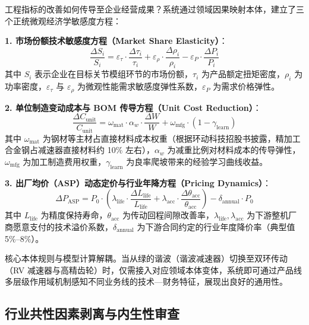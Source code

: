 \documentclass[11pt,a4paper]{ctexart}
\begin{document}
工程指标的改善如何传导至企业经营成果？系统通过领域因果映射本体，建立了三个正统微观经济学敏感度方程：

\textbf{1. 市场份额技术敏感度方程（Market Share Elasticity）}：
\begin{equation}
  \frac{\Delta S_i}{S_i} = \varepsilon_{\tau} \cdot \frac{\Delta \tau_i}{\tau_i} + \varepsilon_{\rho} \cdot \frac{\Delta \rho_i}{\rho_i} - \varepsilon_{P} \cdot \frac{\Delta P_i}{P_i}
\end{equation}
其中 $S_i$ 表示企业在目标关节模组环节的市场份额，$\tau_i$ 为产品额定扭矩密度，$\rho_i$ 为功率密度，$\varepsilon_{\tau}$ 与 $\varepsilon_{\rho}$ 为微观性能需求敏感度弹性系数，$\varepsilon_{P}$ 为需求价格弹性。

\textbf{2. 单位制造变动成本与 BOM 传导方程（Unit Cost Reduction）}：
\begin{equation}
  \frac{\Delta C_{\text{unit}}}{C_{\text{unit}}} = \omega_{\text{mat}} \cdot \alpha_w \cdot \frac{\Delta W}{W} + \omega_{\text{mfg}} \cdot (1 - \gamma_{\text{learn}})
\end{equation}
其中 $\omega_{\text{mat}}$ 为钢材等主材占直接材料成本权重（根据环动科技招股书披露，精加工合金钢占减速器直接材料约 10\% 左右），$\alpha_w$ 为减重比例对材料成本的传导弹性，$\omega_{\text{mfg}}$ 为加工制造费用权重，$\gamma_{\text{learn}}$ 为良率爬坡带来的经验学习曲线收益。

\textbf{3. 出厂均价（ASP）动态定价与行业年降方程（Pricing Dynamics）}：
\begin{equation}
  \Delta P_{\text{ASP}} = P_0 \cdot \left( \lambda_{\text{life}} \cdot \frac{\Delta L_{\text{life}}}{L_{\text{life}}} + \lambda_{\text{acc}} \cdot \frac{\Delta \theta_{\text{acc}}}{\theta_{\text{acc}}} \right) - \delta_{\text{annual}} \cdot P_0
\end{equation}
其中 $L_{\text{life}}$ 为精度保持寿命，$\theta_{\text{acc}}$ 为传动回程间隙改善率，$\lambda_{\text{life}}, \lambda_{\text{acc}}$ 为下游整机厂商愿意支付的技术溢价系数，$\delta_{\text{annual}}$ 为下游合同约定的行业年度降价率（典型值 5\%--8\%）。

核心本体规则与模型计算解耦。当从绿的谐波（谐波减速器）切换至双环传动（RV 减速器与高精齿轮）时，仅需接入对应领域本体变体，系统即可通过产品线多层级作用域机制感知不同业务线的技术—财务特征，展现出良好的通用性。

\subsection{行业共性因素剥离与内生性审查}
\end{document}
